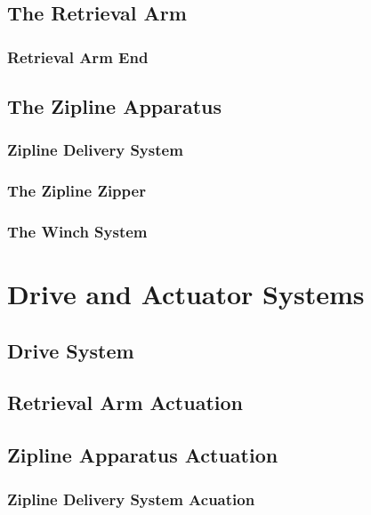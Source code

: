 \documentclass[11pt, oneside]{article} %
\begin{document}
	\subsection{The Retrieval Arm}

		\subsubsection{Retrieval Arm End}

	\subsection{The Zipline Apparatus}
		\subsubsection{Zipline Delivery System}
	
		\subsubsection{The Zipline Zipper}
	
		\subsubsection{The Winch System}

\section{Drive and Actuator Systems}

	\subsection{Drive System}
	
	\subsection{Retrieval Arm Actuation}
	
	\subsection{Zipline Apparatus Actuation}
	
		\subsubsection{Zipline Delivery System Acuation}
		
\end{document}
